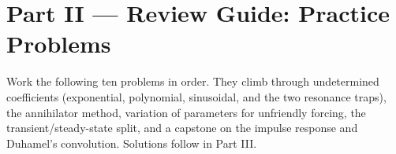 \clearpage
{}
{}
\section*{Part II --- Review Guide: Practice Problems}

Work the following ten problems in order. They climb through undetermined
coefficients (exponential, polynomial, sinusoidal, and the two resonance traps),
the annihilator method, variation of parameters for unfriendly forcing, the
transient/steady-state split, and a capstone on the impulse response and
Duhamel's convolution. Solutions follow in Part III.

